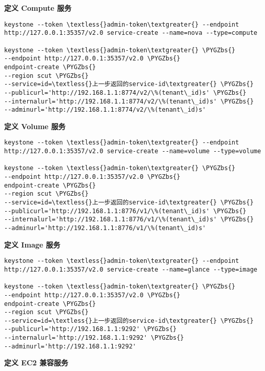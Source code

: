 \documentclass[letterpaper,10pt,english]{sphinxmanual}
\def\PYGZbs{\char`\\}
\begin{document}
\textbf{定义 Compute 服务}

\begin{Verbatim}[commandchars=\\\{\}]
keystone --token \textless{}admin-token\textgreater{} --endpoint http://127.0.0.1:35357/v2.0 service-create --name=nova --type=compute

keystone --token \textless{}admin-token\textgreater{} \PYGZbs{}
--endpoint http://127.0.0.1:35357/v2.0 \PYGZbs{}
endpoint-create \PYGZbs{}
--region scut \PYGZbs{}
--service=id=\textless{}上一步返回的service-id\textgreater{} \PYGZbs{}
--publicurl='http://192.168.1.1:8774/v2/\%(tenant\_id)s' \PYGZbs{}
--internalurl='http://192.168.1.1:8774/v2/\%(tenant\_id)s' \PYGZbs{}
--adminurl='http://192.168.1.1:8774/v2/\%(tenant\_id)s'
\end{Verbatim}

\textbf{定义 Volume 服务}

\begin{Verbatim}[commandchars=\\\{\}]
keystone --token \textless{}admin-token\textgreater{} --endpoint http://127.0.0.1:35357/v2.0 service-create --name=volume --type=volume

keystone --token \textless{}admin-token\textgreater{} \PYGZbs{}
--endpoint http://127.0.0.1:35357/v2.0 \PYGZbs{}
endpoint-create \PYGZbs{}
--region scut \PYGZbs{}
--service=id=\textless{}上一步返回的service-id\textgreater{} \PYGZbs{}
--publicurl='http://192.168.1.1:8776/v1/\%(tenant\_id)s' \PYGZbs{}
--internalurl='http://192.168.1.1:8776/v1/\%(tenant\_id)s' \PYGZbs{}
--adminurl='http://192.168.1.1:8776/v1/\%(tenant\_id)s'
\end{Verbatim}

\textbf{定义 Image 服务}

\begin{Verbatim}[commandchars=\\\{\}]
keystone --token \textless{}admin-token\textgreater{} --endpoint http://127.0.0.1:35357/v2.0 service-create --name=glance --type=image

keystone --token \textless{}admin-token\textgreater{} \PYGZbs{}
--endpoint http://127.0.0.1:35357/v2.0 \PYGZbs{}
endpoint-create \PYGZbs{}
--region scut \PYGZbs{}
--service=id=\textless{}上一步返回的service-id\textgreater{} \PYGZbs{}
--publicurl='http://192.168.1.1:9292' \PYGZbs{}
--internalurl='http://192.168.1.1:9292' \PYGZbs{}
--adminurl='http://192.168.1.1:9292'
\end{Verbatim}

\textbf{定义 EC2 兼容服务}
\end{document}
